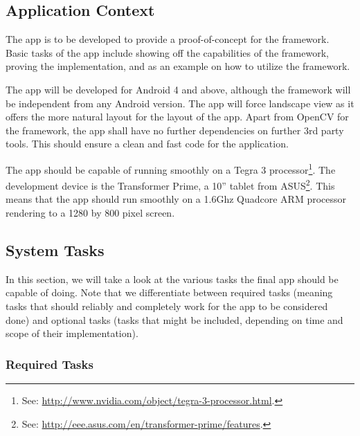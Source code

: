\subsection{Application Context}

The app is to be developed to provide a proof-of-concept for the framework.
Basic tasks of the app include showing off the capabilities of the framework, proving the implementation, and as an example on how to utilize the framework.

The app will be developed for Android 4 and above, although the framework will be independent from any Android version.
The app will force landscape view as it offers the more natural layout for the layout of the app.
Apart from OpenCV for the framework, the app shall have no further dependencies on further 3rd party tools.
This should ensure a clean and fast code for the application.

The app should be capable of running smoothly on a Tegra 3 processor\footnote{See: \url{http://www.nvidia.com/object/tegra-3-processor.html}.}.
The development device is the Transformer Prime, a 10'' tablet from ASUS\footnote{See: \url{http://eee.asus.com/en/transformer-prime/features}.}.
This means that the app should run smoothly on a 1.6Ghz Quadcore ARM processor rendering to a 1280 by 800 pixel screen.

\subsection{System Tasks}

In this section, we will take a look at the various tasks the final app should be capable of doing.
Note that we differentiate between required tasks (meaning tasks that should reliably and completely work for the app to be considered done) and optional tasks (tasks that might be included, depending on time and scope of their implementation).

\subsubsection*{Required Tasks}

